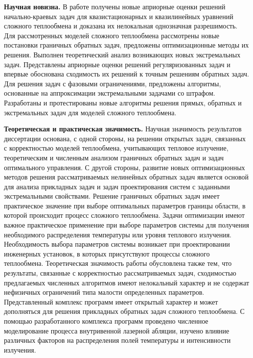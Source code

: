     \textbf{Научная новизна.}
    В работе получены новые априорные оценки решений
    начально-краевых задач для квазистационарных и квазилинейных уравнений
    сложного теплообмена и доказана их нелокальная однозначная
    разрешимость.
    Для рассмотренных моделей сложного теплообмена
    рассмотрены новые постановки граничных обратных задач, предложены
    оптимизационные методы их решения.
    Выполнен теоретический анализ возникающих новых экстремальных задач.
    Представлены априорные оценки решений регуляризованных задач и впервые
    обоснована сходимость их решений к точным решениям обратных задач.
    Для решения задач с фазовыми ограничениями, предложены алгоритмы,
    основанные на аппроксимации экстремальными задачами со штрафом.
    Разработаны и протестированы новые алгоритмы решения прямых,
    обратных и экстремальных задач для моделей сложного теплообмена.


    \textbf{Теоретическая и практическая значимость.}
    Научная значимость результатов диссертации основана, с одной
    стороны, на решении открытых задач, связанных с корректностью моделей
    теплообмена, учитывающих тепловое излучение, теоретическим и
    численным анализом граничных обратных задач и задач оптимального
    управления.
    С другой стороны, развитие новых оптимизационных методов
    решения рассматриваемых нелинейных обратных задач является основой для
    анализа прикладных задач и задач проектирования систем с заданными
    экстремальными свойствами.
    Решение граничных обратных задач имеет практическое значение при
    выборе оптимальных параметров границы области, в которой происходит
    процесс сложного теплообмена.
    Задачи оптимизации имеют важное
    практическое применение при выборе параметров системы для получения
    необходимого распределения температуры или уровня теплового излучения.
    Необходимость выбора параметров системы возникает при проектировании
    инженерных установок, в которых присутствуют процессы сложного
    теплообмена.
    Теоретическая значимость работы обусловлена также тем, что
    результаты, связанные с корректностью рассматриваемых задач,
    сходимостью предлагаемых численных алгоритмов имеют нелокальный
    характер и не содержат нефизичных ограничений типа малости
    определенных параметров.
    Представленный комплекс программ имеет открытый характер и может
    дополняться для решения прикладных обратных задач сложного
    теплообмена.
    С помощью разработанного комплекса программ проведено численное
    моделирование процесса внутривенной лазерной абляции, изучено влияние
    различных факторов на распределения полей температуры и интенсивности
    излучения.



